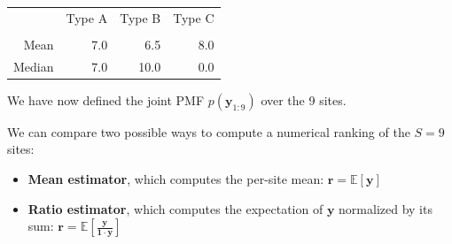 \begin{table}[!h]
    \begin{tabular}{r r r r}
    & \multicolumn{1}{c}{Type A} 
    & \multicolumn{1}{c}{Type B} 
    & \multicolumn{1}{c}{Type C} 
    \\
    & \begin{minipage}[t]{.25\textwidth}
    \centering
    \resizebox{\linewidth}{!}{$\displaystyle
        p(y_s) = \begin{cases}
        0.0 & \text{if}~ y_s = 0~
        \\
        1.0 & \text{if}~ y_s = 7~
        \\
        0.0 & \text{otherwise}
    \end{cases}$}
    \end{minipage}
    & \begin{minipage}[t]{.25\textwidth}
    \centering
    \resizebox{\linewidth}{!}{$\displaystyle
        p(y_s) = \begin{cases}
        0.35 & \text{if}~ y_s = ~0
        \\
        0.65 & \text{if}~ y_s = 10
        \\
        0.0 & \text{otherwise}
    \end{cases}$}
    \end{minipage}
    & \begin{minipage}[t]{.25\textwidth}
    \centering
    \resizebox{\linewidth}{!}{$\displaystyle
        p(y_s) = \begin{cases}
        0.90 & \text{if}~ y_s = ~0
        \\
        0.10 & \text{if}~ y_s = 80
        \\
        0.0 & \text{otherwise}
    \end{cases}$}
    \end{minipage}
    \\
    Mean & 7.0 & 6.5 & 8.0
    \\
    Median & 7.0 & 10.0 & 0.0
    \end{tabular}
\end{table}


We have now defined the joint PMF $p( \bm{y}_{1:9} )$ over the 9 sites. 

We can compare two possible ways to compute a numerical ranking of the $S=9$ sites:
\begin{itemize}
    \item \textbf{Mean estimator}, which computes the per-site mean: $\bm{r} = \mathbb{E}[ \bm{y} ]$
    \item \textbf{Ratio estimator}, which computes the expectation of $\bm{y}$ normalized by its sum: $\bm{r} = \mathbb{E}[ \frac{ \bm{y} }{ \bm{1} \cdot \bm{y} } ]$
\end{itemize}

